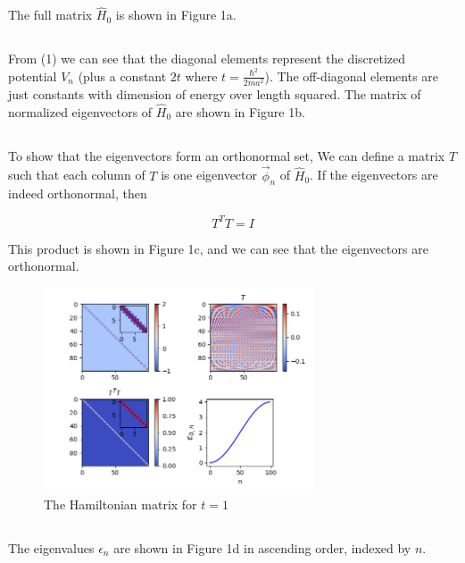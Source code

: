 \documentclass[%
 reprint,
 amsmath,amssymb,
 aps,
]{revtex4-2}
\begin{document}
The full matrix $\hat{H}_{0}$ is shown in Figure 1a. 

\subsection{}

From (1) we can see that the diagonal elements represent the discretized potential $V_{n}$ (plus a constant $2t$ where $t = \frac{\hbar^{2}}{2ma^{2}}$). The off-diagonal elements are just constants with dimension of energy over length squared. The matrix of normalized eigenvectors of $\hat{H}_{0}$ are shown in Figure 1b.

\subsection{}

To show that the eigenvectors form an orthonormal set, We can define a matrix $T$ such that each column of $T$ is one eigenvector $\vec{\phi}_{n}$ of $\hat{H}_{0}$. If the eigenvectors are indeed orthonormal, then

\begin{equation*}
T^{T}T = I
\end{equation*}

This product is shown in Figure 1c, and we can see that the eigenvectors are orthonormal.


\begin{figure}[t!]
\centering
\includegraphics[width=8cm]{p1_1}
\caption{The Hamiltonian matrix for $t=1$}
\label{fig:method}
\end{figure}

\subsection{}

The eigenvalues $\epsilon_{n}$ are shown in Figure 1d in ascending order, indexed by $n$.
\end{document}
